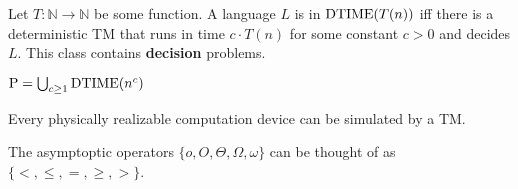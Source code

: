 \begin{note}[$\DTIME$]
  Let $T : \mathbb{N} \to \mathbb{N}$ be some function.
  A language $L$ is in $\mathrm{DTIME}(T(n))$ iff there is a deterministic
  TM that runs in time
  $c \cdot T(n)$ for some constant $c > 0$ and decides $L$.
  This class contains \textbf{decision} problems.
\end{note}

\begin{note}
  $\mathrm{P} = \bigcup_{c \geq 1} \mathrm{DTIME}(n^c)$
\end{note}

\begin{note}
  Every physically realizable computation device can be simulated by a TM.
\end{note}

\begin{note}[Bounds]
  The asymptoptic operators $\{o, O, \Theta, \Omega, \omega\}$ can be thought
  of as $\{ <, \leq, =, \geq, > \}$.
\end{note}
